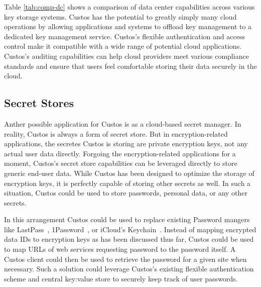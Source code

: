 Table \ref{tab:comp-dc} shows a comparison of data center capabilities
across various key storage systems. Custos has the potential to
greatly simply many cloud operations by allowing applications and
systems to offload key management to a dedicated key management
service. Custos's flexible authentication and access control make it
compatible with a wide range of potential cloud applications. Custos's
auditing capabilities can help cloud providers meet various compliance
standards and ensure that users feel comfortable storing their data
securely in the cloud.

\subsection{Secret Stores}

Anther possible application for Custos is as a cloud-based secret
manager. In reality, Custos is always a form of secret store. But in
encryption-related applications, the secretes Custos is storing are
private encryption keys, not any actual user data directly. Forgoing
the encryption-related applications for a moment, Custos's secret
store capabilities can be leveraged directly to store generic end-user
data. While Custos has been designed to optimize the storage of
encryption keys, it is perfectly capable of storing other secrets as
well. In such a situation, Custos could be used to store passwords,
personal data, or any other secrets.

In this arrangement Custos could be used to replace existing Password
mangers like LastPass~\cite{lastpass}, 1Password~\cite{onepassword},
or iCloud's Keychain~\cite{icloud}. Instead of mapping encrypted data
IDs to encryption keys as has been discussed thus far, Custos could be
used to map URLs of web services requesting password to the password
itself. A Custos client could then be used to retrieve the password
for a given site when necessary. Such a solution could leverage
Custos's existing flexible authentication scheme and central key:value
store to securely keep track of user passwords.

